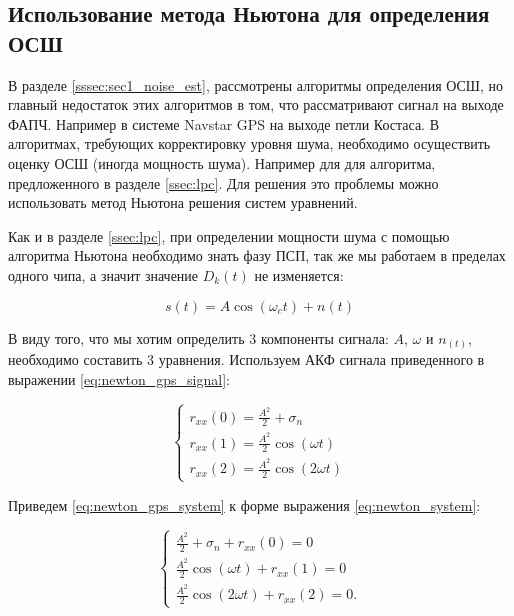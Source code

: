 \subsection{Использование метода Ньютона для определения ОСШ}
В разделе \ref{sssec:sec1_noise_est}, рассмотрены алгоритмы определения ОСШ, но главный недостаток этих алгоритмов в том, что
рассматривают сигнал на выходе ФАПЧ. Например в системе Navstar GPS на выходе петли Костаса. В алгоритмах, требующих
корректировку уровня шума, необходимо осуществить оценку ОСШ (иногда мощность шума). Например для для алгоритма, предложенного
в разделе \ref{ssec:lpc}. Для решения это проблемы можно использовать метод Ньютона решения систем уравнений.

Как и в разделе \ref{ssec:lpc}, при определении мощности шума с помощью алгоритма Ньютона необходимо знать фазу ПСП,
так же мы работаем в пределах одного чипа, а значит значение ${D_k(t)}$ не изменяется:

\begin{center}
\begin{equation}
	\label{eq:newton_gps_signal}
	s(t) = A \cos(\omega_{c}t) + n(t)
\end{equation}
\end{center}

В виду того, что мы хотим определить 3 компоненты сигнала: ${A}$, ${\omega}$ и ${n_(t)}$, необходимо составить 3 уравнения.
Используем АКФ сигнала приведенного в выражении \ref{eq:newton_gps_signal}:
\begin{center}
\begin{equation}
	\label{eq:newton_gps_system}
		\begin{cases}
			r_{xx}(0) = \frac{A^2}{2} + \sigma_n \\
			r_{xx}(1) = \frac{A^2}{2} \cos(\omega t) \\
			r_{xx}(2) = \frac{A^2}{2} \cos(2 \omega t)
		\end{cases}
\end{equation}
\end{center}

Приведем \ref{eq:newton_gps_system} к форме выражения \ref{eq:newton_system}:
\begin{center}
\begin{equation}
	\label{eq:newton_gps_system2}
		\begin{cases}
			\frac{A^2}{2} + \sigma_n + r_{xx}(0) = 0 \\
			\frac{A^2}{2} \cos(\omega t) + r_{xx}(1) = 0 \\
			\frac{A^2}{2} \cos(2 \omega t) + r_{xx}(2) = 0. 
		\end{cases}
\end{equation}
\end{center}

